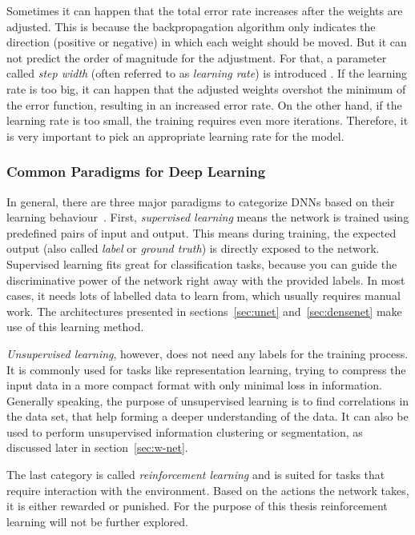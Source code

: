 Sometimes it can happen that the total error rate increases after the weights are adjusted. This is because the backpropagation algorithm only indicates the direction (positive or negative) in which each weight should be moved. But it can not predict the order of magnitude for the adjustment. For that, a parameter called \emph{step width} (often referred to as \emph{learning rate}) is introduced \cite[p.~169]{nn_intro96}. If the learning rate is too big, it can happen that the adjusted weights overshot the minimum of the error function, resulting in an increased error rate. On the other hand, if the learning rate is too small, the training requires even more iterations. Therefore, it is very important to pick an appropriate learning rate for the model.

\subsubsection{Common Paradigms for Deep Learning}
\label{sec:dl_paradigms}
In general, there are three major paradigms to categorize DNNs based on their learning behaviour~\cite[p.~214f]{dlma14}. First, \emph{supervised learning} means the network is trained using predefined pairs of input and output. This means during training, the expected output (also called \emph{label} or \emph{ground truth}) is directly exposed to the network. Supervised learning fits great for classification tasks, because you can guide the discriminative power of the network right away with the provided labels. In most cases, it needs lots of labelled data to learn from, which usually requires manual work. The architectures presented in sections~\ref{sec:unet} and~\ref{sec:densenet} make use of this learning method.

\emph{Unsupervised learning}, however, does not need any labels for the training process. It is commonly used for tasks like representation learning, trying to compress the input data in a more compact format with only minimal loss in information. Generally speaking, the purpose of unsupervised learning is to find correlations in the data set, that help forming a deeper understanding of the data. It can also be used to perform unsupervised information clustering or segmentation, as discussed later in section~\ref{sec:w-net}.

The last category is called \emph{reinforcement learning} and is suited for tasks that require interaction with the environment. Based on the actions the network takes, it is either rewarded or punished. For the purpose of this thesis reinforcement learning will not be further explored.

